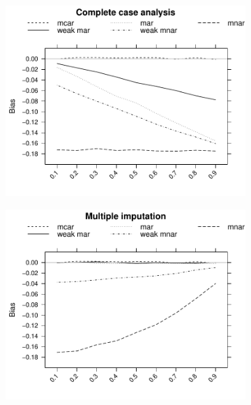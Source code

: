 \documentclass[11pt,a4paper]{article}
\begin{document}
\begin{figure}[t!]
\begin{subfigure}{.51\textwidth}
\includegraphics[width = 1.0\linewidth]{Figures/Figure1a.pdf}
\vspace{-2.2\baselineskip}
\subcaption{}
\label{01a}
\end{subfigure}
\vspace{-1.1\baselineskip}
\begin{subfigure}{.51\textwidth}
\includegraphics[width=1.0\linewidth]{Figures/Figure1b.pdf}
\vspace{-2.2\baselineskip}
\subcaption{}
\label{01b}
\end{subfigure}

\end{figure}
\end{document}
